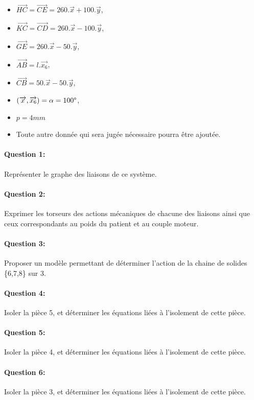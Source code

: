 \begin{itemize}
 \item $\overrightarrow{HC}=\overrightarrow{CE}=260.\overrightarrow{x}+100.\overrightarrow{y}$,
 \item $\overrightarrow{KC}=\overrightarrow{CD}=260.\overrightarrow{x}-100.\overrightarrow{y}$,
 \item $\overrightarrow{GE}=260.\overrightarrow{x}-50.\overrightarrow{y}$,
 \item $\overrightarrow{AB}=l.\overrightarrow{x_6}$,
 \item $\overrightarrow{CB}=50.\overrightarrow{x}-50.\overrightarrow{y}$,
 \item $(\overrightarrow{x},\overrightarrow{x_6})=\alpha=100\degree$,
 \item $p=4mm$
 \item Toute autre donnée qui sera jugée nécessaire pourra être ajoutée.
\end{itemize}

\paragraph{Question 1:} Représenter le graphe des liaisons de ce système.

\paragraph{Question 2:} Exprimer les torseurs des actions mécaniques de chacune des liaisons ainsi que ceux correspondants au poids du patient et au couple moteur.

\paragraph{Question 3:} Proposer un modèle permettant de déterminer l'action de la chaine de solides \{6,7,8\} sur 3.
 
\paragraph{Question 4:} Isoler la pièce 5, et déterminer les équations liées à l'isolement de cette pièce.

\paragraph{Question 5:} Isoler la pièce 4, et déterminer les équations liées à l'isolement de cette pièce.

\paragraph{Question 6:} Isoler la pièce 3, et déterminer les équations liées à l'isolement de cette pièce.

